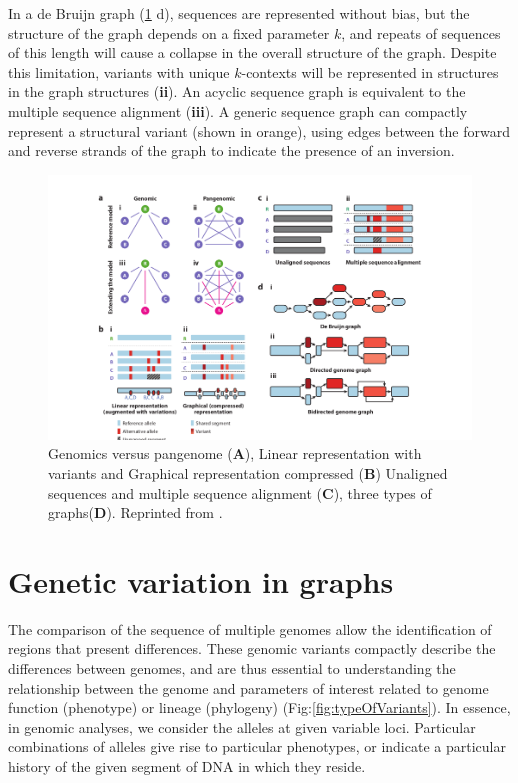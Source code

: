 
In a de Bruijn graph (\ref{fig:genomevspangenome.png} d), sequences are represented without bias, but the structure of the graph depends on a fixed parameter $k$, and repeats of sequences of this length will cause a collapse in the overall structure of the graph.
Despite this limitation, variants with unique $k$-contexts will be represented in structures in the graph structures (\textbf{ii}).
An acyclic sequence graph is equivalent to the multiple sequence alignment (\textbf{iii}).
A generic sequence graph can compactly represent a structural variant (shown in orange), using edges between the forward and reverse strands of the graph to indicate the presence of an inversion.


\begin{figure}[H]
\centering
\includegraphics[width=1.00\textwidth]{fig/pangenome_genome.png}
\decoRule
\caption{Genomics versus pangenome (\textbf{A}), Linear representation with variants and Graphical representation compressed (\textbf{B})  Unaligned sequences and multiple sequence alignment (\textbf{C}), three types of graphs(\textbf{D}). Reprinted from \cite{eizenga2020pangenome}.}
\label{fig:genomevspangenome.png}
\end{figure}


\section{Genetic variation in graphs}
The comparison of the sequence of multiple  genomes allow the identification of regions that present differences.
These genomic variants compactly describe the differences between genomes, and are thus essential to understanding the relationship between the genome and parameters of interest related to genome function (phenotype) or lineage (phylogeny) (Fig:\ref{fig:typeOfVariants}).
In essence, in genomic analyses, we consider the alleles at given variable loci.
Particular combinations of alleles give rise to particular phenotypes, or indicate a particular history of the given segment of DNA in which they reside.


